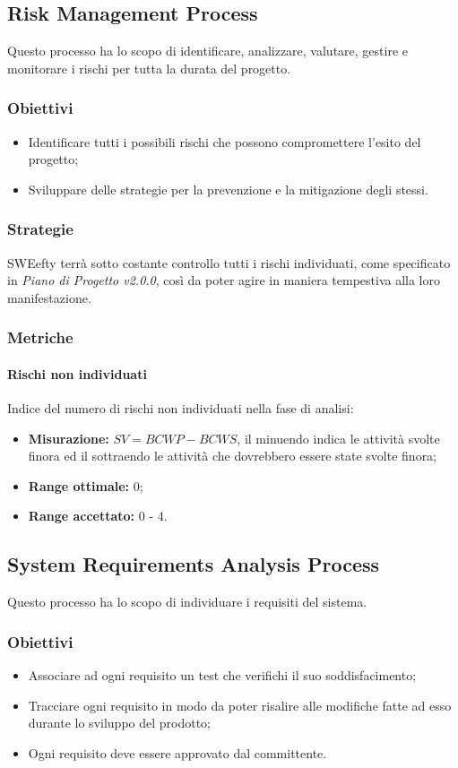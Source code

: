 	\subsection{Risk Management Process}
Questo processo ha lo scopo di identificare, analizzare, valutare, gestire e monitorare i rischi per tutta la durata del progetto.
\subsubsection{Obiettivi}
\begin{itemize}
	\item Identificare tutti i possibili rischi che possono compromettere l'esito del progetto;
	\item Sviluppare delle strategie per la prevenzione e la mitigazione degli stessi.
\end{itemize}
\subsubsection{Strategie}
SWEefty terrà sotto costante controllo tutti i rischi individuati, come specificato in \emph{Piano di Progetto v2.0.0}, così da poter agire in maniera tempestiva alla loro manifestazione.

\subsubsection{Metriche}
\paragraph{Rischi non individuati} \Spazio
Indice del numero di rischi non individuati nella fase di analisi:
	\begin{itemize}
		\item \textbf{Misurazione: }$SV = BCWP - BCWS$, il minuendo indica le attività svolte finora ed il sottraendo le attività che dovrebbero essere state svolte finora;
		\item \textbf{Range ottimale: }0;
		\item \textbf{Range accettato: }0 - 4.
	\end{itemize}


\subsection{System Requirements Analysis Process}
Questo processo ha lo scopo di individuare i requisiti del sistema.
\subsubsection{Obiettivi}
\begin{itemize}
	\item Associare ad ogni requisito un test che verifichi il suo soddisfacimento; 
	\item Tracciare ogni requisito in modo da poter risalire alle modifiche fatte ad esso durante lo sviluppo del prodotto;
	\item Ogni requisito deve essere approvato dal committente.
\end{itemize}

